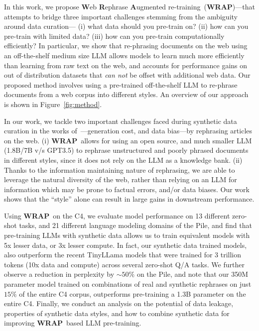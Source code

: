 \documentclass[table]{article}
\newcommand{\ours}{\textbf{WRAP}}
\begin{document}
In this work, we propose \textbf{W}eb \textbf{R}ephrase \textbf{A}ugmented re-training~(\ours)---that attempts to bridge
three important challenges stemming from the ambiguity around data curation---
(i) what data should you pre-train on?
(ii) how can you pre-train with limited data?
(iii) how can you pre-train computationally efficiently?
In particular, we show that re-phrasing documents on the web using an off-the-shelf medium size LLM allows models to learn much more efficiently than learning from raw text on the web, and 
accounts for 
performance gains on out of distribution datasets that \emph{can not} be offset with additional web data. Our proposed method involves using a pre-trained off-the-shelf LLM to re-phrase documents from a web corpus into different styles.  An overview of our approach is shown in Figure~\ref{fig:method}.

In our work, we tackle two important challenges faced during synthetic data curation in the works of~\citet{gunasekar2023textbooks}---generation cost, and data bias---by rephrasing articles on the web. (i) \ours~allows for using an open source, and much smaller LLM (1.8B/7B v/s GPT3.5) to rephrase unstructured and poorly phrased documents in different styles, since it does not rely on the LLM as a knowledge bank. (ii) Thanks to the information maintaining nature of rephrasing, we are able to leverage the natural diversity of the web, rather than relying on an LLM for information which may be prone to factual errors, and/or data biases. Our work shows that the ``style'' alone can result in large gains in downstream performance.

Using \ours~on the C4, we evaluate model performance on 13 different zero-shot tasks, and 21 different language modeling domains of the Pile,  and find that pre-training LLMs with synthetic data allows us to train equivalent models with 5x lesser data, or 3x lesser compute. In fact, our synthetic data trained models, also outperform the recent TinyLLama models that were trained for 3 trillion tokens (10x data and compute) across several zero-shot Q/A tasks. 
We further observe 
a reduction in perplexity by $\sim50\%$ on the Pile,
and note that our 350M parameter model trained on combinations of real and synthetic rephrases on just $15\%$ of the entire C4 corpus,  outperforms pre-training a 1.3B parameter on the entire C4.
Finally, we conduct an analysis on the 
potential of data leakage, 
properties of synthetic data styles, and how to combine synthetic data for improving  \ours~based LLM pre-training.
\end{document}
